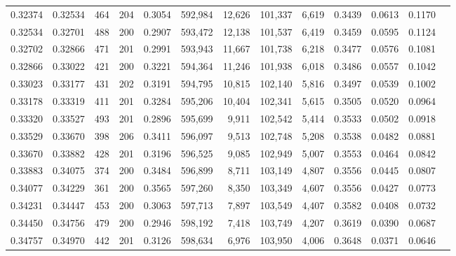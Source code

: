 \begin{tabular}{rrrrrrrrrrrrr}
0.32374 & 0.32534 &   464 & 204 &                                     0.3054 & 592,984 &  12,626 & 101,337 &   6,619 & 0.3439 & 0.0613 & 0.1170 \\
0.32534 & 0.32701 &   488 & 200 &                                     0.2907 & 593,472 &  12,138 & 101,537 &   6,419 & 0.3459 & 0.0595 & 0.1124 \\
0.32702 & 0.32866 &   471 & 201 &                                     0.2991 & 593,943 &  11,667 & 101,738 &   6,218 & 0.3477 & 0.0576 & 0.1081 \\
0.32866 & 0.33022 &   421 & 200 &                                     0.3221 & 594,364 &  11,246 & 101,938 &   6,018 & 0.3486 & 0.0557 & 0.1042 \\
0.33023 & 0.33177 &   431 & 202 &                                     0.3191 & 594,795 &  10,815 & 102,140 &   5,816 & 0.3497 & 0.0539 & 0.1002 \\
0.33178 & 0.33319 &   411 & 201 &                                     0.3284 & 595,206 &  10,404 & 102,341 &   5,615 & 0.3505 & 0.0520 & 0.0964 \\
0.33320 & 0.33527 &   493 & 201 &                                     0.2896 & 595,699 &   9,911 & 102,542 &   5,414 & 0.3533 & 0.0502 & 0.0918 \\
0.33529 & 0.33670 &   398 & 206 &                                     0.3411 & 596,097 &   9,513 & 102,748 &   5,208 & 0.3538 & 0.0482 & 0.0881 \\
0.33670 & 0.33882 &   428 & 201 &                                     0.3196 & 596,525 &   9,085 & 102,949 &   5,007 & 0.3553 & 0.0464 & 0.0842 \\
0.33883 & 0.34075 &   374 & 200 &                                     0.3484 & 596,899 &   8,711 & 103,149 &   4,807 & 0.3556 & 0.0445 & 0.0807 \\
0.34077 & 0.34229 &   361 & 200 &                                     0.3565 & 597,260 &   8,350 & 103,349 &   4,607 & 0.3556 & 0.0427 & 0.0773 \\
0.34231 & 0.34447 &   453 & 200 &                                     0.3063 & 597,713 &   7,897 & 103,549 &   4,407 & 0.3582 & 0.0408 & 0.0732 \\
0.34450 & 0.34756 &   479 & 200 &                                     0.2946 & 598,192 &   7,418 & 103,749 &   4,207 & 0.3619 & 0.0390 & 0.0687 \\
0.34757 & 0.34970 &   442 & 201 &                                     0.3126 & 598,634 &   6,976 & 103,950 &   4,006 & 0.3648 & 0.0371 & 0.0646 \\

\end{tabular}
